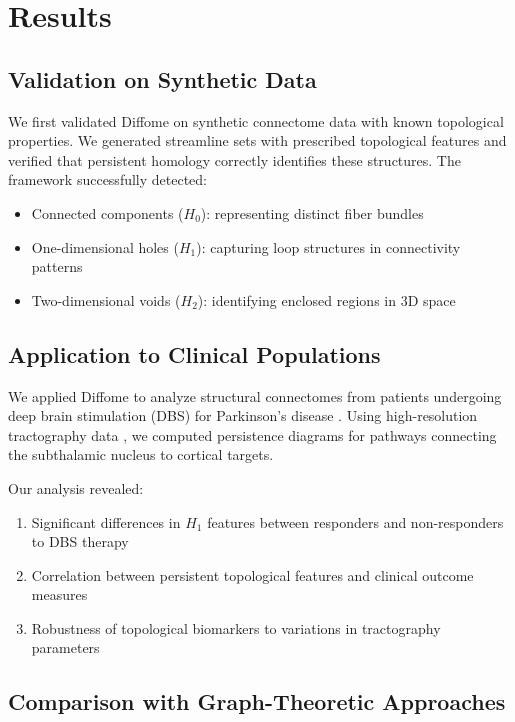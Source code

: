 \documentclass[12pt,a4paper]{article}
\begin{document}
\section{Results}

\subsection{Validation on Synthetic Data}

We first validated Diffome on synthetic connectome data with known topological properties. We generated streamline sets with prescribed topological features and verified that persistent homology correctly identifies these structures. The framework successfully detected:
\begin{itemize}
    \item Connected components ($H_0$): representing distinct fiber bundles
    \item One-dimensional holes ($H_1$): capturing loop structures in connectivity patterns
    \item Two-dimensional voids ($H_2$): identifying enclosed regions in 3D space
\end{itemize}

\subsection{Application to Clinical Populations}

We applied Diffome to analyze structural connectomes from patients undergoing deep brain stimulation (DBS) for Parkinson's disease \citep{horn2021connectomic}. Using high-resolution tractography data \citep{petersen2019holographic}, we computed persistence diagrams for pathways connecting the subthalamic nucleus to cortical targets.

Our analysis revealed:
\begin{enumerate}
    \item Significant differences in $H_1$ features between responders and non-responders to DBS therapy
    \item Correlation between persistent topological features and clinical outcome measures
    \item Robustness of topological biomarkers to variations in tractography parameters
\end{enumerate}

\subsection{Comparison with Graph-Theoretic Approaches}
\end{document}
